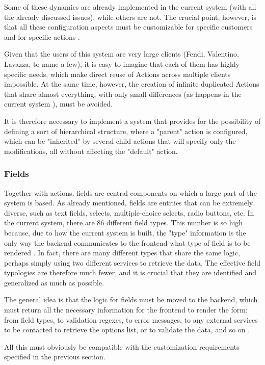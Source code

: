 Some of these dynamics are already implemented in the current system (with all the already discussed issues), while others are not. The crucial point, however, is that all these configuration aspects must be customizable for specific customers and for specific actions \cite{requirements_meeting}.

Given that the users of this system are very large clients (Fendi, Valentino, Lavazza, to name a few), it is easy to imagine that each of them has highly specific needs, which make direct reuse of Actions across multiple clients impossible. At the same time, however, the creation of infinite duplicated Actions that share almost everything, with only small differences (as happens in the current system \cite{requirements_meeting}), must be avoided. 

It is therefore necessary to implement a system that provides for the possibility of defining a sort of hierarchical structure, where a "parent" action is configured, which can be "inherited" by several child actions that will specify only the modifications, all without affecting the "default" action.

\subsubsection{Fields}
Together with actions, fields are central components on which a large part of the system is based. 
As already mentioned, fields are entities that can be extremely diverse, such as text fields, selects, multiple-choice selects, radio buttons, etc.
In the current system, there are 86 different field types. This number is so high because, due to how the current system is built, the "type" information is the only way the backend communicates to the frontend what type of field is to be rendered \cite{srp_webservicerest_git}. In fact, there are many different types that share the same logic, perhaps simply using two different services to retrieve the data. The effective field typologies are therefore much fewer, and it is crucial that they are identified and generalized as much as possible. 

The general idea is that the logic for fields must be moved to the backend, which must return all the necessary information for the frontend to render the form: from field types, to validation regexes, to error messages, to any external services to be contacted to retrieve the options list, or to validate the data, and so on \cite{requirements_meeting}.

All this must obviously be compatible with the customization requirements specified in the previous section. 


